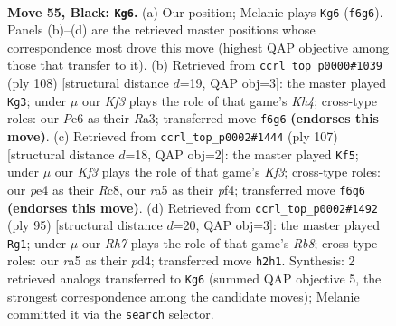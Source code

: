 \documentclass[11pt]{article}
\begin{document}
\clearpage

\begin{figure}[p]\centering
\begin{subfigure}{0.46\textwidth}\centering
\resizebox{\linewidth}{!}{%
\newchessgame
\chessboard[
  setfen={8/5p2/4pk2/R7/P1R1P3/3K1P2/7r/8 b - - 2 55},
  showmover=false,
  pgfstyle=straightmove, color=movearrow, markmove={f6-g6}
]}
\caption{}
\end{subfigure}\hfill
\begin{subfigure}{0.46\textwidth}\centering
\resizebox{\linewidth}{!}{%
\newchessgame
\chessboard[
  setfen={8/5pk1/5r1p/8/6PK/R6P/8/8 w - - 9 55},
  showmover=false,
  pgfstyle=straightmove, color=movearrow, markmove={h4-g3}
]}
\caption{}
\end{subfigure}
\\[4pt]
\begin{subfigure}{0.46\textwidth}\centering
\resizebox{\linewidth}{!}{%
\newchessgame
\chessboard[
  setfen={2r5/5p2/5kpp/8/5P2/1P1R3P/6PK/8 b - - 1 54},
  showmover=false,
  pgfstyle=straightmove, color=movearrow, markmove={f6-f5}
]}
\caption{}
\end{subfigure}\hfill
\begin{subfigure}{0.46\textwidth}\centering
\resizebox{\linewidth}{!}{%
\newchessgame
\chessboard[
  setfen={8/1p6/1kp5/8/P2P4/2K3p1/2PR2P1/1r6 b - - 3 48},
  showmover=false,
  pgfstyle=straightmove, color=movearrow, markmove={b1-g1}
]}
\caption{}
\end{subfigure}
\caption{\textbf{Move 55, Black: \texttt{Kg6}.} (a) Our position; Melanie plays \texttt{Kg6} (\texttt{f6g6}). Panels (b)--(d) are the retrieved master positions whose correspondence most drove this move (highest QAP objective among those that transfer to it). (b) Retrieved from \texttt{ccrl\_top\_p0000\#1039} (ply 108) [structural distance $d$=19, QAP obj=3]: the master played \texttt{Kg3}; under $\mu$ our \emph{Kf3} plays the role of that game's \emph{Kh4}; cross-type roles: our \emph{P}e6 as their \emph{R}a3; transferred move \texttt{f6g6} \textbf{(endorses this move)}. (c) Retrieved from \texttt{ccrl\_top\_p0002\#1444} (ply 107) [structural distance $d$=18, QAP obj=2]: the master played \texttt{Kf5}; under $\mu$ our \emph{Kf3} plays the role of that game's \emph{Kf3}; cross-type roles: our \emph{p}e4 as their \emph{R}c8, our \emph{r}a5 as their \emph{p}f4; transferred move \texttt{f6g6} \textbf{(endorses this move)}. (d) Retrieved from \texttt{ccrl\_top\_p0002\#1492} (ply 95) [structural distance $d$=20, QAP obj=3]: the master played \texttt{Rg1}; under $\mu$ our \emph{Rh7} plays the role of that game's \emph{Rb8}; cross-type roles: our \emph{r}a5 as their \emph{p}d4; transferred move \texttt{h2h1}. Synthesis: 2 retrieved analogs transferred to \texttt{Kg6} (summed QAP objective 5, the strongest correspondence among the candidate moves); Melanie committed it via the \texttt{search} selector.}
\label{fig:thought-m109}
\end{figure}
\end{document}
